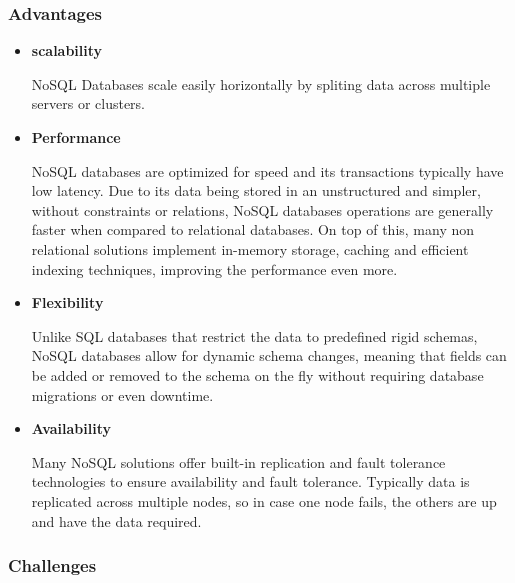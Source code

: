 \subsubsection{Advantages}
\begin{itemize}

	\item \textbf{scalability}

	      \gls{NoSQL} Databases scale easily horizontally by spliting data across
	      multiple servers or clusters.

	\item \textbf{Performance}

	      \gls{NoSQL} databases are optimized for speed and its transactions typically have
	      low latency. Due to its data being stored in an unstructured and simpler,
	      without constraints or relations, \gls{NoSQL} databases operations are generally
	      faster when compared to relational databases. On top of this, many non
	      relational solutions implement in-memory storage, caching and efficient
	      indexing techniques, improving the performance even more.

	\item \textbf{Flexibility}

	      Unlike \gls{SQL} databases that restrict the data to predefined rigid schemas,
	      \gls{NoSQL} databases allow for dynamic schema changes, meaning that fields can
	      be added or removed to the schema on the fly without requiring database
	      migrations or even downtime.

	\item \textbf{Availability}

	      Many \gls{NoSQL} solutions offer built-in replication and fault tolerance
	      technologies to ensure availability and fault tolerance. Typically data is
	      replicated across multiple nodes, so in case one node fails, the others
	      are up and have the data required.

\end{itemize}

\subsubsection{Challenges}

